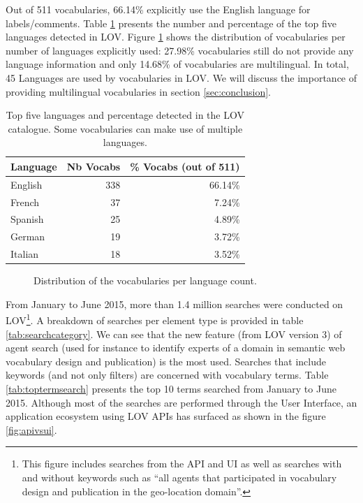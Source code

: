 \documentclass{iosart2c}
\begin{document}
Out of 511 vocabularies, 66.14\% explicitly use the English language for labels/comments. Table \ref{tab:language} presents the number and percentage of the top five languages detected in LOV. Figure \ref{fig:langdist} shows the distribution of vocabularies per number of languages explicitly used: 27.98\% vocabularies still do not provide any language information and only 14.68\% of vocabularies are multilingual. In total, 45 Languages are used by vocabularies in LOV. We will discuss the importance of providing multilingual vocabularies  in section \ref{sec:conclusion}.

 \begin{table}[h!tb]
\caption{Top five languages and percentage detected in the LOV catalogue. Some vocabularies can make use of multiple languages.}
\begin{tabular}{lrr}
\hline
\textbf{Language} & \textbf{Nb Vocabs} & \textbf{\% Vocabs (out of 511)}  \\ \hline
English & 338 & 66.14\%      \\
French & 37 & 7.24\%      \\
Spanish & 25 & 4.89\%      \\
German & 19 & 3.72\%      \\
Italian & 18 & 3.52\%      \\
\hline  
\end{tabular}
\label{tab:language}
\end{table}

\begin{figure}[htb]

\caption{\label{fig:langdist} Distribution of the vocabularies per language count.}
\end{figure}

From January to June 2015, more than 1.4 million searches were conducted on LOV\footnote{This figure includes searches from the API and UI as well as searches with and without keywords such as ``all agents that participated in vocabulary design and publication in the geo-location domain''.}. A breakdown of searches per element type is provided in table \ref{tab:searchcategory}. We can see that the new feature (from LOV version 3) of agent search (used for instance to identify experts of a domain in semantic web vocabulary design and publication) is the most used. Searches that include keywords (and not only filters) are concerned with vocabulary terms. Table \ref{tab:toptermsearch} presents the top 10 terms searched from January to June 2015. Although most of the searches are performed through the User Interface, an application ecosystem using LOV APIs has surfaced as shown in the figure \ref{fig:apivsui}. 
\end{document}
